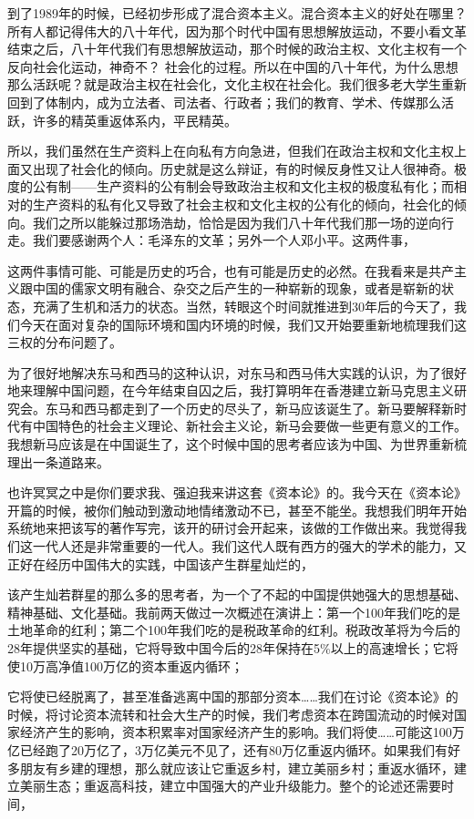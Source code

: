 \documentclass[UTF8, 12pt, a4paper]{ctexrep}
\begin{document}
到了1989年的时候，已经初步形成了混合资本主义。混合资本主义的好处在哪里？所有人都记得伟大的八十年代，因为那个时代中国有思想解放运动，不要小看文革结束之后，八十年代我们有思想解放运动，那个时候的政治主权、文化主权有一个反向社会化运动，神奇不？ 社会化的过程。所以在中国的八十年代，为什么思想那么活跃呢？就是政治主权在社会化，文化主权在社会化。我们很多老大学生重新回到了体制内，成为立法者、司法者、行政者；我们的教育、学术、传媒那么活跃，许多的精英重返体系内，平民精英。

所以，我们虽然在生产资料上在向私有方向急进，但我们在政治主权和文化主权上面又出现了社会化的倾向。历史就是这么辩证，有的时候反身性又让人很神奇。极度的公有制——生产资料的公有制会导致政治主权和文化主权的极度私有化；而相对的生产资料的私有化又导致了社会主权和文化主权的公有化的倾向，社会化的倾向。我们之所以能躲过那场浩劫，恰恰是因为我们八十年代我们那一场的逆向行走。我们要感谢两个人：毛泽东的文革；另外一个人邓小平。这两件事，

这两件事情可能、可能是历史的巧合，也有可能是历史的必然。在我看来是共产主义跟中国的儒家文明有融合、杂交之后产生的一种崭新的现象，或者是崭新的状态，充满了生机和活力的状态。当然，转眼这个时间就推进到30年后的今天了，我们今天在面对复杂的国际环境和国内环境的时候，我们又开始要重新地梳理我们这三权的分布问题了。

为了很好地解决东马和西马的这种认识，对东马和西马伟大实践的认识，为了很好地来理解中国问题，在今年结束自囚之后，我打算明年在香港建立新马克思主义研究会。东马和西马都走到了一个历史的尽头了，新马应该诞生了。新马要解释新时代有中国特色的社会主义理论、新社会主义论，新马会要做一些更有意义的工作。我想新马应该是在中国诞生了，这个时候中国的思考者应该为中国、为世界重新梳理出一条道路来。

也许冥冥之中是你们要求我、强迫我来讲这套《资本论》的。我今天在《资本论》开篇的时候，被你们触动到激动地情绪激动不已，甚至不能坐。我想我们明年开始系统地来把该写的著作写完，该开的研讨会开起来，该做的工作做出来。我觉得我们这一代人还是非常重要的一代人。我们这代人既有西方的强大的学术的能力，又正好在经历中国伟大的实践，中国该产生群星灿烂的，

该产生灿若群星的那么多的思考者，为一个了不起的中国提供她强大的思想基础、精神基础、文化基础。我前两天做过一次概述在演讲上：第一个100年我们吃的是土地革命的红利；第二个100年我们吃的是税政革命的红利。税政改革将为今后的28年提供坚实的基础，它将导致中国今后的28年保持在5\%以上的高速增长；它将使10万高净值100万亿的资本重返内循环；

它将使已经脱离了，甚至准备逃离中国的那部分资本……我们在讨论《资本论》的时候，将讨论资本流转和社会大生产的时候，我们考虑资本在跨国流动的时候对国家经济产生的影响，资本积累率对国家经济产生的影响。我们将使……可能这100万亿已经跑了20万亿了，3万亿美元不见了，还有80万亿重返内循环。如果我们有好多朋友有乡建的理想，那么就应该让它重返乡村，建立美丽乡村；重返水循环，建立美丽生态；重返高科技，建立中国强大的产业升级能力。整个的论述还需要时间，
\end{document}
